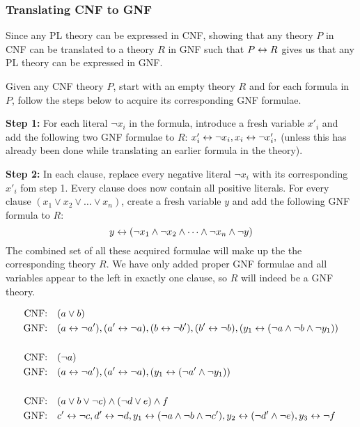 \subsubsection{Translating CNF to GNF}
\label{subs:Translating CNF to GNF}
Since any PL theory can be expressed in CNF, showing that any theory $P$ in CNF can be translated to a theory $R$ in GNF such that $P \leftrightarrow R$ gives us that any PL theory can be expressed in GNF.

Given any CNF theory $P$, start with an empty theory $R$ and for each formula in $P$, follow the steps below to acquire its corresponding GNF formulae.

\textbf{Step 1:}
For each literal $\neg x_i$ in the formula, introduce a fresh variable $x'_i$ and add the following two GNF formulae to $R$: $x'_i \leftrightarrow \neg x_i, x_i \leftrightarrow \neg x'_i,$ (unless this has already been done while translating an earlier formula in the theory).

\textbf{Step 2:}
In each clause, replace every negative literal $\neg x_i$ with its corresponding $x'_i$ fom step 1. Every clause does now contain all positive literals.
For every clause $(x_1 \vee x_2 \vee \dots \vee x_n)$, create a fresh variable $y$ and add the following GNF formula to $R$:
\[y \leftrightarrow (\neg x_1 \wedge \neg x_2 \wedge \dots \wedge \neg x_n \wedge \neg y)\]
The combined set of all these acquired formulae will make up the the corresponding theory $R$.
We have only added proper GNF formulae and all variables appear to the left in exactly one clause, so $R$ will indeed be a GNF theory.\\

\begin{example}
  \begin{align}
    \text{CNF:\quad}& ( a \vee b )\\
    \text{GNF:\quad}& ( a \leftrightarrow \neg a'), (a' \leftrightarrow \neg a), (b \leftrightarrow \neg b'), (b' \leftrightarrow \neg b), (y_1 \leftrightarrow (\neg a \wedge \neg b \wedge \neg y_1))\\
    \\
    \text{CNF:\quad}& (\neg a)\\
    \text{GNF:\quad}& ( a \leftrightarrow \neg a'), (a' \leftrightarrow \neg a), (y_1 \leftrightarrow (\neg a' \wedge \neg y_1))\\
    \\
    \text{CNF:\quad}& (a \vee b \vee \neg c) \wedge (\neg d \vee e) \wedge f\\
    \text{GNF:\quad}& c' \leftrightarrow \neg c, d' \leftrightarrow \neg d, y_1 \leftrightarrow (\neg a \wedge \neg b \wedge \neg c'), y_2 \leftrightarrow (\neg d' \wedge \neg e), y_3 \leftrightarrow \neg f
  \end{align}
\end{example}
